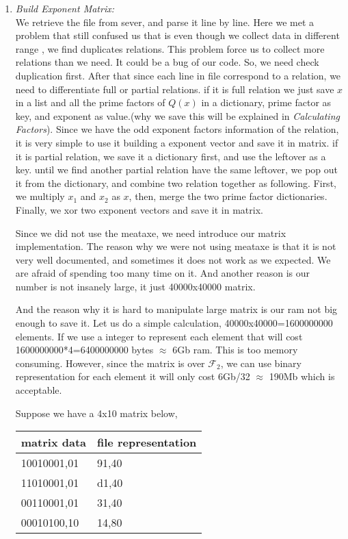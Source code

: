 \documentclass[12pt]{article} %
\newcommand{\itemgap}[1][2]{\vspace{#1mm}}
\begin{document}
\begin{enumerate}
		\item \textit{Build Exponent Matrix:} \itemgap
		\\ We retrieve the file from sever, and parse it line by line. Here we met a problem that still confused us that is even though we collect data in different range , we find duplicates relations. This problem force us to collect more relations than we need. It could be a bug of our code. So, we need check duplication first.
		After that since each line in file correspond to a relation, we need to differentiate full or partial relations. if it is full relation we just save $x$ in a list and all the prime factors of $Q(x)$ in a dictionary, prime factor as key, and exponent as value.(why we save this will be explained in \textit{Calculating Factors}). Since we have the odd exponent factors information of the relation, it is very simple to use it building a exponent vector and save it in matrix. if it is partial relation, we save it a dictionary first, and use the leftover as a key. until we find another partial relation have the same leftover, we pop out it from the dictionary, and combine two relation together as following. First, we multiply $x_1$ and $x_2$ as $x$, then, merge the two prime factor dictionaries. Finally, we xor two exponent vectors and save it in matrix.
		
		Since we did not use the meataxe, we need introduce our matrix implementation. The reason why we were not using meataxe is that it is not very well documented, and sometimes it does not work as we expected. We are afraid of spending too many time on it. And another reason is our number is not insanely large, it just 40000x40000 matrix. 
		
		And the reason why it is hard to manipulate large matrix is our ram not big enough to save it. Let us do a simple calculation, 40000x40000=1600000000 elements. If we use a integer to represent each element that will cost 1600000000*4=6400000000 bytes $\approx$ 6Gb ram. This is too memory consuming. However, since the matrix is over $\mathcal{F}_2$, we can use binary representation for each element it will only cost 6Gb/32 $\approx$ 190Mb which is acceptable. 
		
		Suppose we have a 4x10 matrix below, 
		\begin{table}[h]
			\centering
			\begin{tabular}{|l|l|}
				\hline
				matrix data & file representation \\
				\hline
				10010001,01 & 91,40 \\
				\hline
				11010001,01 & d1,40 \\
				\hline
				00110001,01 & 31,40 \\
				\hline
				00010100,10 & 14,80 \\
				\hline
			\end{tabular}
		\end{table}
		

\end{enumerate}
\end{document}
